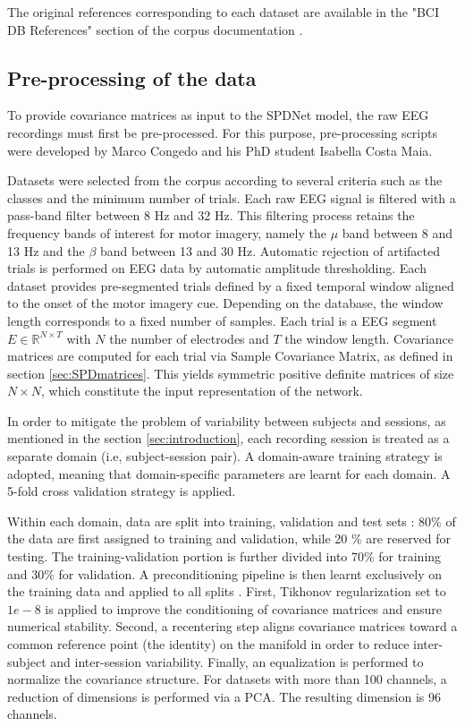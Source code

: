 \documentclass[11pt,a4paper]{article}
\begin{document}
The original references corresponding to each dataset are available in the "BCI DB References" section of the corpus documentation \cite{corpus}. 




\subsection{Pre-processing of the data}

To provide covariance matrices as input to the SPDNet model, the raw EEG recordings must first be pre-processed. For this purpose, pre-processing scripts were developed by Marco Congedo and his PhD student Isabella Costa Maia.

Datasets were selected from the corpus according to several criteria such as the classes and the minimum number of trials. Each raw EEG signal is filtered with a pass-band filter between 8 Hz and 32 Hz. This filtering process retains the frequency bands of interest for motor imagery, namely the $\mu$ band between 8 and 13 Hz and the $\beta$ band between 13 and 30 Hz. 
Automatic rejection of artifacted trials is performed on  EEG data by automatic amplitude thresholding.
Each dataset provides pre-segmented trials defined by a fixed temporal window aligned to the onset of the motor imagery cue. Depending on the database, the window length corresponds to a fixed number of samples. Each trial is a EEG segment $E \in \mathbb{R}^{N \times T}$ with $N$ the number of electrodes and $T$ the window length. Covariance matrices are computed for each trial via Sample Covariance Matrix, as defined in section \ref{sec:SPDmatrices}. This yields symmetric positive definite matrices of size $N \times N$, which constitute the input representation of the network. 

In order to mitigate the problem of variability between subjects and sessions, as mentioned in the section \ref{sec:introduction}, each recording session is treated as a separate domain (i.e, subject-session pair). A domain-aware training strategy is adopted, meaning that domain-specific parameters are learnt for each domain. A 5-fold cross validation strategy is applied. 

Within each domain, data are split into training, validation and test sets : 80$\%$ of the data are first assigned to training and validation, while 20 $\%$ are reserved for testing. The training-validation portion is further divided into 70$\%$ for training and 30$\%$ for validation. 
A preconditioning pipeline is then learnt exclusively on the training data and applied to all splits \cite{precond}. First, Tikhonov regularization set to $1e-8$ is applied to improve the conditioning of covariance matrices and ensure numerical stability. Second, a recentering step aligns covariance matrices toward a common reference point (the identity) on the manifold in order to reduce inter-subject and inter-session variability. Finally, an equalization is performed to normalize the covariance structure. For datasets with more than 100 channels, a reduction of dimensions is performed via a PCA. The resulting dimension is 96 channels. 
\end{document}
